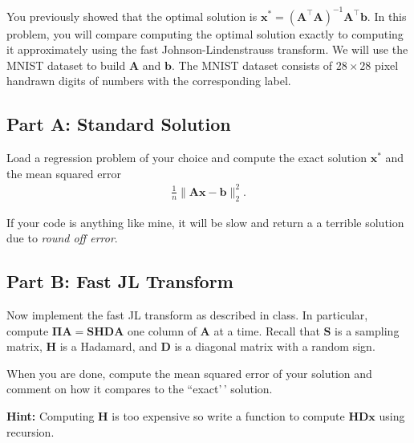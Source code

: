 \documentclass{article}
\begin{document}
You previously showed that the optimal solution is \(\mathbf{x}^* = \left(\mathbf{A}^\top \mathbf{A} \right)^{-1} \mathbf{A}^\top \mathbf{b}\). In this problem, you will compare computing the optimal solution exactly to computing it approximately using the fast Johnson-Lindenstrauss transform. We will use the MNIST dataset to build \(\mathbf{A}\) and \(\mathbf{b}\). The MNIST dataset consists of \(28 \times 28\) pixel handrawn digits of numbers with the corresponding label.

\hypertarget{part-a-standard-solution}{%
\subsection*{Part A: Standard Solution}\label{part-a-standard-solution}}

Load a regression problem of your choice and compute the exact solution \(\mathbf{x}^*\) and the mean squared error \begin{align*}
    \frac1{n} \| \mathbf{Ax} - \mathbf{b} \|_2^2.
\end{align*}

If your code is anything like mine, it will be slow and return a a terrible solution due to \textit{round off error}.

\hypertarget{part-b-fast-jl-transform}{%
\subsection*{Part B: Fast JL Transform}\label{part-b-fast-jl-transform}}

Now implement the fast JL transform as described in class. In particular, compute \(\mathbf{\Pi A} = \mathbf{S H D A}\) one column of \(\mathbf{A}\) at a time. Recall that \(\mathbf{S}\) is a sampling matrix, \(\mathbf{H}\) is a Hadamard, and \(\mathbf{D}\) is a diagonal matrix with a random sign.

When you are done, compute the mean squared error of your solution and comment on how it compares to the ``exact'\,' solution.

\textbf{Hint:} Computing \(\mathbf{H}\) is too expensive so write a function to compute \(\mathbf{HDx}\) using recursion.
\end{document}
